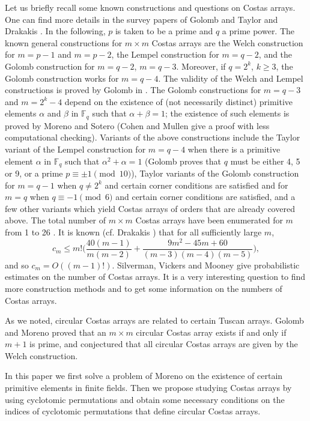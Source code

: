 \documentclass[10pt]{amsart}
\begin{document}
Let us briefly recall some  known constructions and questions on
Costas arrays.  One can find more details in the survey papers
of Golomb and Taylor \cite{MR674209,golomb1984} and Drakakis \cite{drakakis}.
In the following, $p$ is taken to be a prime and $q$ a prime power.
 The known general
constructions for $m \times m$ Costas arrays are the Welch
construction for $m=p-1$ and $m=p-2$, the Lempel construction for
$m=q-2$, and the Golomb construction for $m=q-2$, $m=q-3$. Moreover,
if $q=2^k$, $k\geq 3$, the Golomb construction works for
$m=q-4$.
 The validity of the Welch and Lempel constructions is proved by
Golomb in \cite{MR749508}. The Golomb constructions for $m=q-3$ and
$m=2^k-4$ depend on the existence of (not necessarily distinct)
primitive elements $\alpha$ and $\beta$ in $\mathbb{F}_q$ such that
$\alpha+\beta=1$; the existence of such elements is proved by Moreno
and Sotero \cite{moreno1990} (Cohen and Mullen \cite{MR1209243}
give a proof with
less computational checking). Variants of the
above constructions include the Taylor variant of the Lempel
construction for $m=q-4$ when there is a primitive element $\alpha$
in $\mathbb{F}_q$ such that $\alpha^2+\alpha=1$ (Golomb 
\cite{golomb1992} proves that $q$ must be either 4, 5 or 9, or a prime $p
\equiv \pm 1 \pmod{10}$), Taylor variants of the Golomb construction
for $m=q-1$ when $q \neq 2^k$ and certain corner conditions are
satisfied and for $m=q$ when $q \equiv -1 \pmod{6}$ and certain
corner conditions are satisfied, and a few other variants which
yield Costas arrays of orders that are already covered above.
The total number of
$m \times m$ Costas arrays have
been enumerated for $m$ from 1 to 26 \cite{beard}.
It is known (cf. Drakakis \cite{drakakis}) that for all sufficiently large
$m$,
\[
c_m \leq
m!\bigg(\frac{40(m-1)}{m(m-2)}+\frac{9m^2-45m+60}{(m-3)(m-4)(m-5)}\bigg),
\]
and so $c_m=O((m-1)!)$.
Silverman,
Vickers and Mooney \cite{silverman} give probabilistic
estimates on the number of Costas arrays.
It is a very
interesting question to find more construction methods and to get
some information on the numbers of Costas arrays.

As we noted, circular Costas arrays are related to certain Tuscan
arrays. Golomb and Moreno \cite{periodicity} proved  that an $m
\times m$ circular Costas array exists if and only if $m+1$ is
prime, and conjectured that all circular Costas arrays are given
by the Welch construction.

In this paper we
first solve a problem of Moreno \cite[Question~2]{MR1992966} on the
existence of certain primitive elements in finite fields.
Then we propose studying Costas
arrays by using cyclotomic permutations  and obtain some necessary
conditions on the indices of cyclotomic permutations that define
circular Costas arrays.
\end{document}

